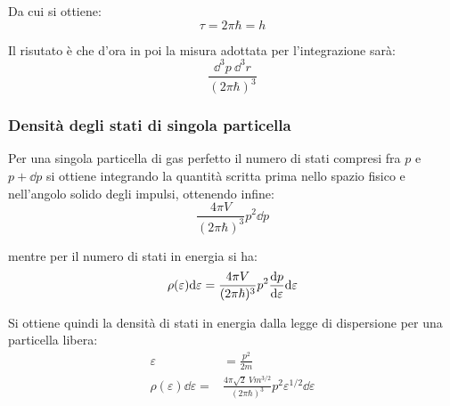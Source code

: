 \noindent Da cui si ottiene:
\begin{equation*}
\tau = 2 \pi \hbar = h
\end{equation*}

Il risutato è che d'ora in poi la misura adottata per l'integrazione sarà:
\begin{equation*}
	\frac{\dd^3p~\dd^3r}{(2\pi\hbar)^3} 
\end{equation*}

\subsubsection{Densità degli stati di singola particella}

Per una singola particella di gas perfetto il numero di stati compresi fra $p$ e $p + \dd p$ si ottiene integrando la quantità scritta prima nello spazio fisico e nell'angolo solido degli impulsi, ottenendo infine:
\begin{equation*}
\frac{4\pi V}{(2\pi \hbar)^3}p^2 \dd p
\end{equation*}

\noindent mentre per il numero di stati in energia si ha:
\begin{equation*}
\rho(\varepsilon) \dd \varepsilon = \frac{4\pi V}{(2\pi \hbar)^3}p^2 \derivative{p}{\varepsilon}\dd \varepsilon
\end{equation*}

Si ottiene quindi la densità di stati in energia dalla legge di dispersione per una particella libera:
\begin{align*}
	\varepsilon &= \frac{p^2}{2m}\\
	\rho(\varepsilon) \dd \varepsilon = &\frac{4\pi \sqrt{2}~V m^{3/2}}{(2\pi \hbar)^3}p^2 \varepsilon^{1/2}\dd \varepsilon
\end{align*}

